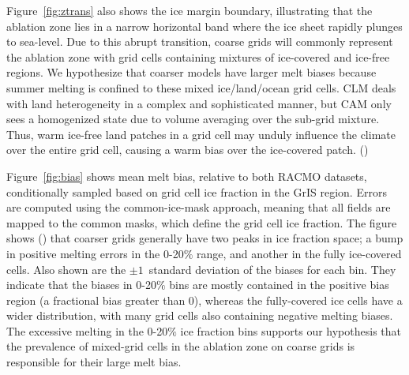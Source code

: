 \documentclass[draft]{agujournal2019}
\begin{document}
Figure~\ref{fig:ztrans} also shows the ice margin boundary, illustrating that the ablation zone lies in a narrow horizontal band where the ice sheet rapidly plunges to sea-level. Due to this abrupt transition, coarse grids will commonly represent the ablation zone with grid cells containing mixtures of ice-covered and ice-free regions. We hypothesize that coarser models have larger melt biases
because summer melting is confined to these mixed ice/land/ocean grid cells. CLM deals with land heterogeneity in a complex and sophisticated manner, but CAM only sees a homogenized state due to volume averaging over the sub-grid mixture. Thus, warm ice-free land patches in a grid cell may unduly influence the climate over the entire grid cell, causing a warm bias over the ice-covered patch. ({\color{blue}{This is an interesting conclusion pointing to the need for better treatment of surface inhomogeneity in CAM.  This might be a way to compensate for coarse resolution in future CESM versions?}})

Figure~\ref{fig:bias} shows mean melt bias, relative to both RACMO datasets, conditionally sampled based on grid cell ice fraction in the GrIS region. Errors are computed using the common-ice-mask approach, meaning that all fields are mapped to the common masks, which define the grid cell ice fraction. The figure shows ({\color{blue}{Any idea why the errors are smaller in the cells with intermediate ice fraction?  I wouldn't have expected this.}}) that coarser grids generally have two peaks in ice fraction space; a bump in positive melting errors in the 0-20$\%$ range, and another in the fully ice-covered cells. Also shown are the $\pm 1$~standard deviation of the biases for each bin. They indicate that the biases in 0-20$\%$ bins are mostly contained in the positive bias region (a fractional bias greater than 0), whereas the fully-covered ice cells have a wider distribution, with many grid cells also containing negative melting biases. The excessive melting in the 0-20$\%$ ice fraction bins supports our hypothesis that the prevalence of mixed-grid cells in the ablation zone on coarse grids is responsible for their large melt bias.

{\color{green}{Rene - is the melt map consistent with the bin figure? Smallest errors are interior points which correspond to glacier_fraction bin of 1, which the largest errors.}}{\color{blue}{ARH - I can check. The bin figure is fractional change so its a different metric, which could explain the apparent inconsistency.}}
\end{document}
